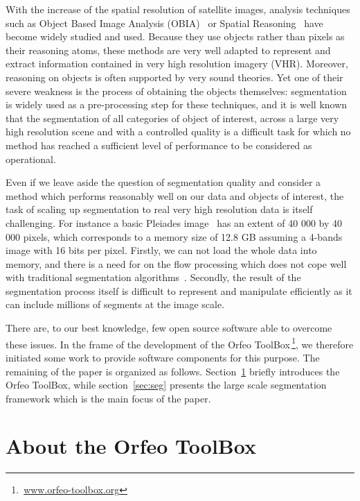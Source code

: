 \documentclass{josis}
\newcommand{\furl}[1]{$\,$\footnote{$\,$\url{#1}}}
\begin{document}
With the increase of the spatial resolution of satellite images,
analysis techniques such as Object Based Image Analysis
(OBIA)~\cite{michel2010lazy} or Spatial
Reasoning~\cite{inglada2009qualitative,vanegas2009fuzzy,vanegas2010detection}
have become widely studied and used. Because they use objects rather
than pixels as their reasoning atoms, these methods are very well
adapted to represent and extract information contained in very high
resolution imagery (VHR). Moreover, reasoning on objects is often
supported by very sound theories. Yet one of their severe weakness is
the process of obtaining the objects themselves: segmentation is
widely used as a pre-processing step for these techniques, and it is
well known that the segmentation of all categories of object of
interest, across a large very high resolution scene and with a
controlled quality is a difficult task for which no method has reached
a sufficient level of performance to be considered as operational.

Even if we leave aside the question of segmentation quality and
consider a method which performs reasonably well on our data
and objects of interest, the task of scaling up segmentation to real
very high resolution data is itself challenging.  For instance a basic
Pleiades image~\cite{tinel2012orfeo} has an extent of 40 000 by 40 000
pixels, which corresponds to a memory size of 12.8 GB assuming a
4-bands image with 16 bits per pixel. Firstly, we can not load the
whole data into memory, and there is a need for on the flow processing
which does not cope well with traditional segmentation
algorithms~\cite{shi2000normalized}. Secondly, the result of the
segmentation process itself is difficult to represent and manipulate
efficiently as it can include millions of segments at the image scale.

There are, to our best knowledge, few open source software able to
overcome these issues. In the frame of the development of the Orfeo
ToolBox\furl{www.orfeo-toolbox.org}, we therefore initiated some work
to provide software components for this purpose. The remaining of the
paper is organized as follows. Section~\ref{sec:otb} briefly
introduces the Orfeo ToolBox, while section~\ref{sec:seg}
presents the large scale segmentation framework which is the main
focus of the paper.

\section{About the Orfeo ToolBox}\label{sec:otb}
\end{document}
